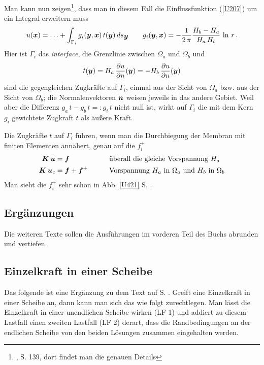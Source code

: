 Man kann nun zeigen\footnote{\cite{Ha3}, S. 139, dort findet man die genauen Details}, dass man in diesem Fall die Einflussfunktion (\ref{U207}) um ein Integral erweitern muss
\begin{align}
u(\mbox{\boldmath $x$}) = \ldots + \int_{\Gamma_i} g_i(\mbox{\boldmath $y$}, \mbox{\boldmath $x$})\,t(\mbox{\boldmath $y$})\,ds_{\mbox{\boldmath $y$}} \qquad g_i(\mbox{\boldmath $y$}, \mbox{\boldmath $x$}) = - \frac{1}{2\,\pi}\frac{H_b - H_a}{H_a\,H_b}\,\ln\,r\,.
\end{align}
Hier ist $\Gamma_i$ das {\em interface\/}, die Grenzlinie zwischen $\Omega_a$ und $\Omega_b$ und
\begin{align}
t(\mbox{\boldmath $y$}) = H_a\,\frac{\partial u}{\partial n}(\mbox{\boldmath $y$}) = -  H_b\,\frac{\partial u}{\partial n}(\mbox{\boldmath $y$})
\end{align}
sind die gegengleichen Zugkr\"{a}fte auf $\Gamma_i$, einmal aus der Sicht von $\Omega_a$ bzw. aus der Sicht von $\Omega_b$; die Normalenvektoren $\mbox{\boldmath $n$}$ weisen jeweils in das andere Gebiet. Weil aber die Differenz $g_a\,t - g_b\,t =: g_i\,t$ nicht null ist, wirkt auf $\Gamma_i$ die mit dem Kern $g_i$ gewichtete Zugkraft $t$ als \"{a}u{\ss}ere Kraft.

Die Zugkr\"{a}fte $t$ auf $\Gamma_i$ f\"{u}hren, wenn man die Durchbiegung der Membran mit finiten Elementen ann\"{a}hert, genau auf die $f_i^+$
\begin{alignat}{2}
\mbox{\boldmath $K$}\,\mbox{\boldmath $u$} &= \mbox{\boldmath $f$} \qquad &&\text{\"{u}berall die gleiche Vorspannung $H_a$} \nonumber \\
\mbox{\boldmath $K$}\,\mbox{\boldmath $u$}_c &= \mbox{\boldmath $f$} + \mbox{\boldmath $f$}^+ \qquad &&\text{Vorspannung $H_a$ in $\Omega_a$ und $H_b$ in $\Omega_b$} \nonumber
\end{alignat}
Man sieht die $f_i^+$ sehr sch\"{o}n in Abb. \ref{U421} S. \pageref{U421}.


\textcolor{sectionTitleBlue}{\section{Erg\"{a}nzungen}}
Die weiteren Texte sollen die Ausf\"{u}hrungen im vorderen Teil des Buchs abrunden und vertiefen.

\textcolor{sectionTitleBlue}{\subsection{Einzelkraft in einer Scheibe}}\label{BeweisP}
Das folgende ist eine Erg\"{a}nzung zu dem Text auf S. \pageref{PPX}. Greift eine Einzelkraft in einer Scheibe an, dann kann man sich das wie folgt zurechtlegen. Man l\"{a}sst die Einzelkraft in einer unendlichen Scheibe wirken (LF 1) und addiert zu diesem Lastfall einen zweiten Lastfall (LF 2) derart, dass die Randbedingungen an der endlichen Scheibe von den beiden L\"{o}sungen zusammen eingehalten werden.

